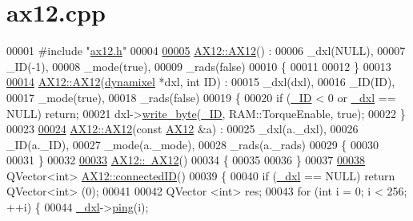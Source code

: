 \hypertarget{a00008_source}{}\section{ax12.\+cpp}
\label{a00008_source}

\begin{DoxyCode}
00001 \textcolor{preprocessor}{#include "\hyperlink{a00009}{ax12.h}"}
00004 
\hypertarget{a00008_source_l00005}{}\hyperlink{a00001_ab7c557985e755d6119e5e2d979f928ae}{00005} \hyperlink{a00001_ab7c557985e755d6119e5e2d979f928ae}{AX12::AX12}() :
00006     \_dxl(NULL),
00007     \_ID(-1),
00008     \_mode(true),
00009     \_rads(false)
00010 \{
00011     
00012 \}
00013 
\hypertarget{a00008_source_l00014}{}\hyperlink{a00001_a205be9b4dde785bd40b88f575a64f4d8}{00014} \hyperlink{a00001_ab7c557985e755d6119e5e2d979f928ae}{AX12::AX12}(\hyperlink{a00003}{dynamixel} *dxl, \textcolor{keywordtype}{int} ID) : 
00015     \_dxl(dxl),
00016     \_ID(ID),
00017    \_mode(true),
00018    \_rads(false)
00019 \{
00020     \textcolor{keywordflow}{if} (\hyperlink{a00001_a0ae2b35fee3d120075e1d8f1e2055804}{\_ID} < 0 or \hyperlink{a00001_a16df7ccc0a8d3c585a93b6916734bb17}{\_dxl} == NULL) \textcolor{keywordflow}{return};
00021     dxl->\hyperlink{a00003_a66c1e32cc45dd46d329f1fc212e46a3d}{write\_byte}(\hyperlink{a00001_a0ae2b35fee3d120075e1d8f1e2055804}{\_ID}, RAM::TorqueEnable, \textcolor{keyword}{true});
00022 \}
00023 
\hypertarget{a00008_source_l00024}{}\hyperlink{a00001_a37b76666533323ec317f5156dbef2a89}{00024} \hyperlink{a00001_ab7c557985e755d6119e5e2d979f928ae}{AX12::AX12}(\textcolor{keyword}{const} \hyperlink{a00001}{AX12} &a) :
00025     \_dxl(a.\_dxl),
00026     \_ID(a.\_ID),
00027     \_mode(a.\_mode),
00028     \_rads(a.\_rads)
00029 \{
00030     
00031 \}
00032 
\hypertarget{a00008_source_l00033}{}\hyperlink{a00001_a5e9382e65479cdcb248f5303ac4c96d9}{00033} \hyperlink{a00001_a5e9382e65479cdcb248f5303ac4c96d9}{AX12::~AX12}()
00034 \{
00035     
00036 \}
00037 
\hypertarget{a00008_source_l00038}{}\hyperlink{a00001_a2fa05296aa57896a5cb0ef4ce0aa96f1}{00038} QVector<int> \hyperlink{a00001_a2fa05296aa57896a5cb0ef4ce0aa96f1}{AX12::connectedID}()
00039 \{
00040     \textcolor{keywordflow}{if} (\hyperlink{a00001_a16df7ccc0a8d3c585a93b6916734bb17}{\_dxl} == NULL) \textcolor{keywordflow}{return} QVector<int> (0);
00041     
00042     QVector <int> res;
00043     \textcolor{keywordflow}{for} (\textcolor{keywordtype}{int} i = 0; i < 256; ++i) \{
00044         \hyperlink{a00001_a16df7ccc0a8d3c585a93b6916734bb17}{\_dxl}->\hyperlink{a00003_af2bd714423e7c4fc089762805c0c71f3}{ping}(i);

\end{DoxyCode}
